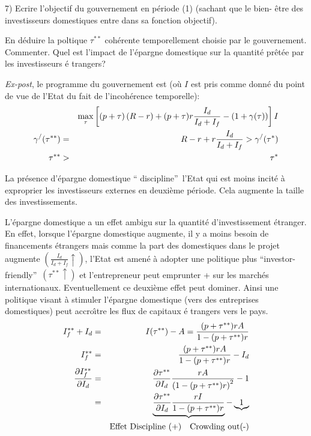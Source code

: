 \documentclass[a4paper]{article}
\begin{document}
7) Ecrire l'objectif du gouvernement en p\'{e}riode (1) (sachant que le bien-%
\^{e}tre des investisseurs domestiques entre dans sa fonction objectif).

En d\'{e}duire la poltique $\tau ^{\ast \ast }$ coh\'{e}rente temporellement
choisie par le gouvernement. Commenter. Quel est l'impact de l'\'{e}pargne
domestique sur la quantit\'{e} pr\^{e}t\'{e}e par les investisseurs \'{e}%
trangers?

\bigskip

\textit{Ex-post}, le programme du gouvernement est (o\`{u} $I$ est pris
comme donn\'{e} du point de vue de l'Etat du fait de l'incoh\'{e}rence
temporelle):%
\begin{eqnarray*}
&&\max_{\tau }\left[ (p+\tau )\left( R-r\right) +(p+\tau )r\frac{I_{d}}{%
I_{d}+I_{f}}-\left( 1+\gamma (\tau )\right) \right] I \\
\gamma ^{/}(\tau ^{\ast \ast }) &=&R-r+r\frac{I_{d}}{I_{d}+I_{f}}>\gamma
^{/}(\tau ^{\ast }) \\
\tau ^{\ast \ast } &>&\tau ^{\ast }
\end{eqnarray*}

La pr\'{e}sence d'\'{e}pargne domestique \textquotedblleft
discipline\textquotedblright\ l'Etat qui est moins incit\'{e} \`{a}
exproprier les investisseurs externes en deuxi\`{e}me p\'{e}riode. Cela
augmente la taille des investissements.

L'\'{e}pargne domestique a un effet ambigu sur la quantit\'{e}
d'investissement \'{e}tranger. En effet, lorsque l'\'{e}pargne domestique
augmente, il y a moins besoin de financements \'{e}trangers mais comme la
part des domestiques dans le projet augmente $(\frac{I_{d}}{I_{d}+I_{f}}%
\uparrow )$, l'Etat est amen\'{e} \`{a} adopter une politique plus
\textquotedblleft investor-friendly\textquotedblright\ $(\tau ^{\ast \ast
}\uparrow )$ et l'entrepreneur peut emprunter + sur les march\'{e}s
internationaux. Eventuellement ce deuxi\`{e}me effet peut dominer. Ainsi une
politique visant \`{a} stimuler l'\'{e}pargne domestique (vers des
entreprises domestiques) peut accro\^{\i}tre les flux de capitaux \'{e}%
trangers vers le pays.%
\begin{eqnarray*}
I_{f}^{\ast \ast }+I_{d} &=&I(\tau ^{\ast \ast })-A=\frac{(p+\tau ^{\ast
\ast })rA}{1-(p+\tau ^{\ast \ast })r} \\
I_{f}^{\ast \ast } &=&\frac{(p+\tau ^{\ast \ast })rA}{1-(p+\tau ^{\ast \ast
})r}-I_{d} \\
\frac{\partial I_{f}^{\ast \ast }}{\partial I_{d}} &=&\frac{\partial \tau
^{\ast \ast }}{\partial I_{d}}\frac{rA}{\left( 1-(p+\tau ^{\ast \ast
})r\right) ^{2}}-1 \\
&=&\underbrace{\frac{\partial \tau ^{\ast \ast }}{\partial I_{d}}\frac{rI}{%
1-(p+\tau ^{\ast \ast })r}}-\underbrace{1} \\
&&\text{Effet Discipline (+)\ \ \ Crowding out(-)}
\end{eqnarray*}
\end{document}
